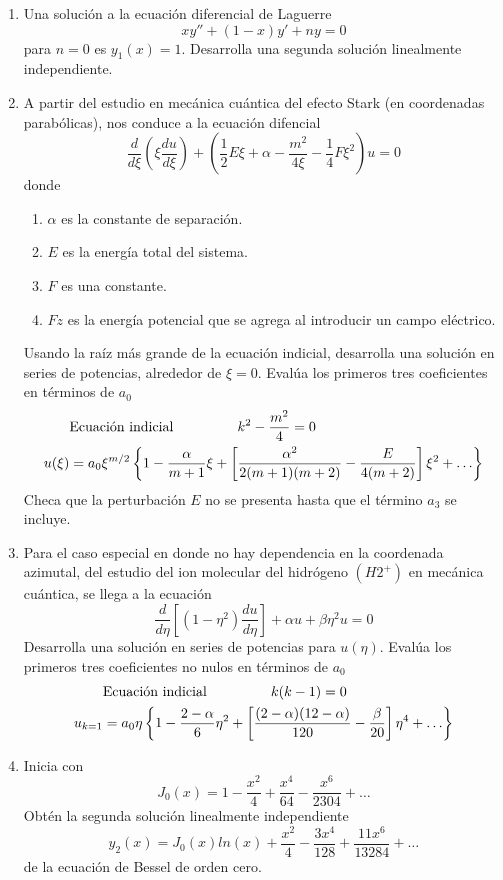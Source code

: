 \begin{enumerate}
\item Una solución a la ecuación diferencial de Laguerre
\[ xy'' + (1-x) y' + ny = 0\]
para $n=0$ es $y_{1}(x)=1$. Desarrolla una segunda solución linealmente independiente.
\item A partir del estudio en mecánica cuántica del efecto Stark (en coordenadas parabólicas), nos conduce a la ecuación difencial
\[ \dfrac{d}{d \xi} \left( \xi \dfrac{d u}{d \xi} \right) + \left( \dfrac{1}{2} E \xi + \alpha - \dfrac{m^{2}}{4 \xi} - \dfrac{1}{4} F \xi^{2} \right) u = 0 \]
donde
\begin{enumerate}[label=(\roman*)]
\item $\alpha$ es la constante de separación.
\item $E$ es la energía total del sistema.
\item $F$ es una constante.
\item $Fz$ es la energía potencial que se agrega al introducir un campo eléctrico.
\end{enumerate}
Usando la raíz más grande de la ecuación indicial, desarrolla una solución en series de potencias, alrededor de $\xi=0$. Evalúa los primeros tres coeficientes en términos de $a_{0}$
\[  \begin{split}
& \text{Ecuación indicial } \hspace{1.5cm} k^{2} - \dfrac{m^{2}}{4} = 0 \\
u(\xi) &=  a_{0} \xi^{m/2} \left\lbrace 1 - \dfrac{\alpha}{m+1} \xi + \left[ \dfrac{\alpha^{2}}{2(m+1)(m+2)} - \dfrac{E}{4(m+2)} \right] \xi^{2} + \ldots \right\rbrace
\end{split} \]
Checa que la perturbación $E$ no se presenta hasta que el término $a_{3}$ se incluye.
\item Para el caso especial en donde no hay dependencia en la coordenada azimutal, del estudio del ion molecular del hidrógeno $(H2^{+})$ en mecánica cuántica, se llega a la ecuación
\[ \dfrac{d}{d \eta} \left[ (1 - \eta^{2} ) \dfrac{d u}{d \eta} \right] + \alpha u + \beta \eta^{2} u = 0 \]
Desarrolla una solución en series de potencias para $u(\eta)$. Evalúa los primeros tres coeficientes no nulos en términos de $a_{0}$
\[  \begin{split}
& \text{Ecuación indicial } \hspace{1.5cm} k(k-1) = 0 \\
u_{k=1} &=  a_{0} \eta \left\lbrace 1 - \dfrac{2- \alpha}{6} \eta^{2} + \left[ \dfrac{(2-\alpha)(12-\alpha)}{120} - \dfrac{\beta}{20} \right] \eta^{4} + \ldots \right\rbrace
\end{split} \] 

\item Inicia con 
\[ J_{0} (x) = 1 - \dfrac{x^{2}}{4} +  \dfrac{x^{4}}{64} -  \dfrac{x^{6}}{2304} + \ldots \]
Obtén la segunda solución linealmente independiente
\[ y_{2}(x) = J_{0}(x) ln(x) + \dfrac{x^{2}}{4} -  \dfrac{3 x^{4}}{128} +  \dfrac{11 x^{6}}{13284}+ \ldots \]
de la ecuación de Bessel de orden cero.
\end{enumerate}


